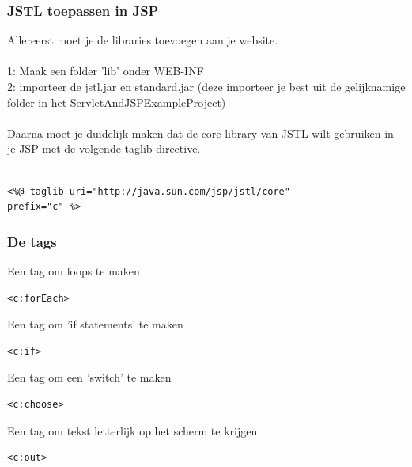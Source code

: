 \documentclass{beamer}
\begin{document}
\begin{frame}[fragile]

\frametitle{JSTL toepassen in JSP}

Allereerst moet je de libraries toevoegen aan je website. \\~\\

1: Maak een folder 'lib' onder WEB-INF\\
2: importeer de jstl.jar en standard.jar (deze importeer je best
uit de gelijknamige folder in het ServletAndJSPExampleProject)\\~\\

Daarna moet je duidelijk maken dat de core library van JSTL wilt gebruiken in je JSP met de volgende taglib directive.

\begin{verbatim} 

<%@ taglib uri="http://java.sun.com/jsp/jstl/core" 
prefix="c" %>

\end{verbatim}

\end{frame}


\begin{frame}[fragile]

\frametitle{De tags}

Een tag om loops te maken

\begin{verbatim}
<c:forEach>
\end{verbatim}

Een tag om 'if statements' te maken

\begin{verbatim}
<c:if>
\end{verbatim}

Een tag om een 'switch' te maken

\begin{verbatim}
<c:choose>
\end{verbatim}

Een tag om tekst letterlijk op het scherm te krijgen

\begin{verbatim}
<c:out>
\end{verbatim}

\end{frame}
\end{document}
